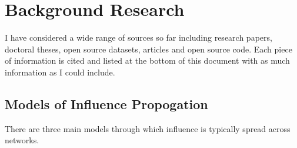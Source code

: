 \documentclass{article}
\begin{document}



\section{Background Research}

I have considered a wide range of sources so far including research papers, doctoral theses, open source datasets, articles and open source code.
Each piece of information is cited and listed at the bottom of this document with as much information as I could include.

\subsection{Models of Influence Propogation}
There are three main models through which influence is typically spread across networks.
\end{document}

